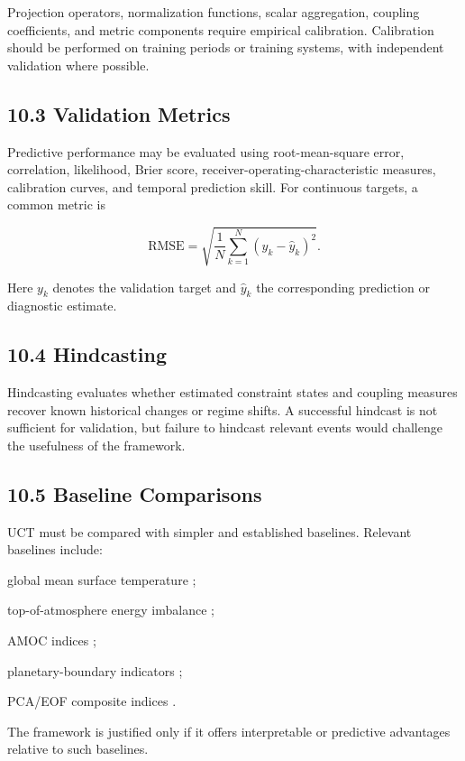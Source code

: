 \documentclass[aps,pre,reprint,superscriptaddress,nofootinbib]{revtex4-2}
\begin{document}
Projection operators, normalization functions, scalar aggregation, coupling coefficients, and metric components require empirical calibration. Calibration should be performed on training periods or training systems, with independent validation where possible.

\subsection{10.3 Validation Metrics}

Predictive performance may be evaluated using root-mean-square error, correlation, likelihood, Brier score, receiver-operating-characteristic measures, calibration curves, and temporal prediction skill. For continuous targets, a common metric is

\[ \mathrm{RMSE}=\sqrt{\frac{1}{N}\sum_{k=1}^N (y_k-\hat{y}_k)^2}. \]

Here \(y_k\) denotes the validation target and \(\hat{y}_k\) the corresponding prediction or diagnostic estimate.

\subsection{10.4 Hindcasting}

Hindcasting evaluates whether estimated constraint states and coupling measures recover known historical changes or regime shifts. A successful hindcast is not sufficient for validation, but failure to hindcast relevant events would challenge the usefulness of the framework.

\subsection{10.5 Baseline Comparisons}

UCT must be compared with simpler and established baselines. Relevant baselines include:

global mean surface temperature \cite{IPCCAR6WG1};

top-of-atmosphere energy imbalance \cite{LoebCERES};

AMOC indices \cite{IPCCAR6WG1,RoemmichArgo};

planetary-boundary indicators \cite{Rockstrom2009,Steffen2015,Richardson2023};

PCA/EOF composite indices \cite{Jolliffe2002PCA,Preisendorfer1988EOF}.

The framework is justified only if it offers interpretable or predictive advantages relative to such baselines.
\end{document}
